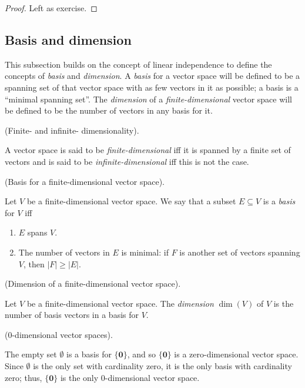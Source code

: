 \begin{proof}
   Left as exercise.
\end{proof}


\newpage

\subsection*{Basis and dimension}

This subsection builds on the concept of linear independence to define the concepts of \textit{basis} and \textit{dimension}. A \textit{basis} for a vector space will be defined to be a spanning set of that vector space with as few vectors in it as possible; a basis is a ``minimal spanning set''. The \textit{dimension} of a \textit{finite-dimensional} vector space will be defined to be the number of vectors in any basis for it.

\begin{defn}
    (Finite- and infinite- dimensionality).
    
    A vector space is said to be \textit{finite-dimensional} iff it is spanned by a finite set of vectors and is said to be \textit{infinite-dimensional} iff this is not the case.
\end{defn}

\begin{defn}
    (Basis for a finite-dimensional vector space). 
    
    Let $V$ be a finite-dimensional vector space. We say that a subset $E \subseteq V$ is a \textit{basis} for $V$ iff
    
    \begin{enumerate}
        \item $E$ spans $V$.
        \item The number of vectors in $E$ is minimal: if $F$ is another set of vectors spanning $V$, then $|F| \geq |E|$.
    \end{enumerate}
\end{defn}

\begin{defn}
    (Dimension of a finite-dimensional vector space).
    
    Let $V$ be a finite-dimensional vector space. The \textit{dimension} $\dim(V)$ of $V$ is the number of basis vectors in a basis for $V$.
\end{defn}

\begin{remark}
    ($0$-dimensional vector spaces). 
    
    The empty set $\emptyset$ is a basis for $\{\mathbf{0}\}$, and so $\{\mathbf{0}\}$ is a zero-dimensional vector space. Since $\emptyset$ is the only set with cardinality zero, it is the only basis with cardinality zero; thus, $\{\mathbf{0}\}$ is the only $0$-dimensional vector space.
\end{remark}

